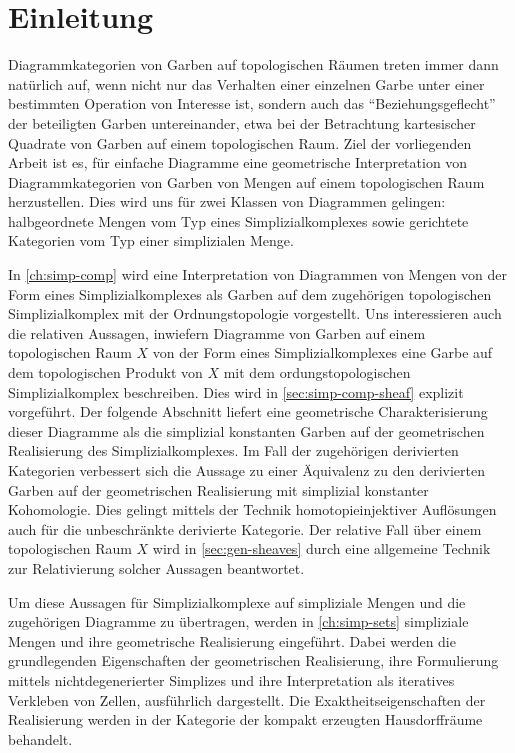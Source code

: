 
\section*{Einleitung}

Diagrammkategorien von Garben auf topologischen Räumen treten immer
dann natürlich auf, wenn nicht nur das Verhalten einer einzelnen Garbe
unter einer bestimmten Operation von Interesse ist, sondern auch das
``Beziehungsgeflecht'' der beteiligten Garben untereinander, etwa bei
der Betrachtung kartesischer Quadrate von Garben auf einem
topologischen Raum. Ziel der vorliegenden Arbeit ist es, für einfache
Diagramme eine geometrische Interpretation von Diagrammkategorien von
Garben von Mengen auf einem topologischen Raum herzustellen. Dies wird
uns für zwei Klassen von Diagrammen gelingen: halbgeordnete Mengen vom
Typ eines Simplizialkomplexes sowie gerichtete Kategorien vom Typ
einer simplizialen Menge.

In \autoref{ch:simp-comp} wird eine Interpretation von Diagrammen von
Mengen von der Form eines Simplizialkomplexes als Garben auf dem
zugehörigen topologischen Simplizialkomplex mit der Ordnungstopologie
vorgestellt. Uns interessieren auch die relativen Aussagen, inwiefern
Diagramme von Garben auf einem topologischen Raum $X$ von der Form
eines Simplizialkomplexes eine Garbe auf dem topologischen Produkt von
$X$ mit dem ordungstopologischen Simplizialkomplex beschreiben. Dies
wird in \autoref{sec:simp-comp-sheaf} explizit vorgeführt. Der
folgende Abschnitt liefert eine geometrische Charakterisierung dieser
Diagramme als die simplizial konstanten Garben auf der geometrischen
Realisierung des Simplizialkomplexes. Im Fall der zugehörigen
derivierten Kategorien verbessert sich die Aussage zu einer Äquivalenz
zu den derivierten Garben auf der geometrischen Realisierung mit
simplizial konstanter Kohomologie. Dies gelingt mittels der Technik
homotopieinjektiver Auflösungen auch für die unbeschränkte derivierte
Kategorie. Der relative Fall über einem topologischen Raum $X$ wird in
\autoref{sec:gen-sheaves} durch eine allgemeine Technik zur
Relativierung solcher Aussagen beantwortet.

Um diese Aussagen für Simplizialkomplexe auf simpliziale Mengen und
die zugehörigen Diagramme zu übertragen, werden in
\autoref{ch:simp-sets} simpliziale Mengen und ihre geometrische
Realisierung eingeführt. Dabei werden die grundlegenden Eigenschaften
der geometrischen Realisierung, ihre Formulierung mittels
nichtdegenerierter Simplizes und ihre Interpretation als iteratives
Verkleben von Zellen, ausführlich dargestellt. Die
Exaktheitseigenschaften der Realisierung werden in der Kategorie der
kompakt erzeugten Hausdorffräume behandelt.

